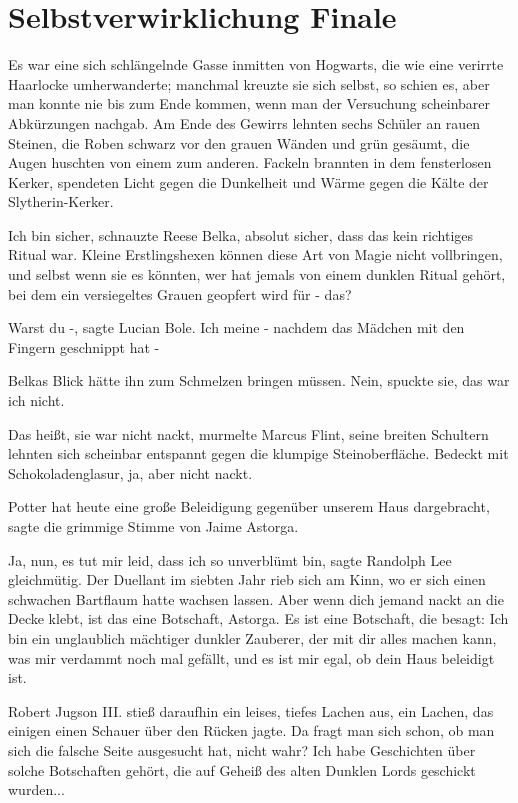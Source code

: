 \chapter{Selbstverwirklichung Finale}

Es war eine sich schlängelnde Gasse inmitten von Hogwarts, die wie eine verirrte
Haarlocke umherwanderte; manchmal kreuzte sie sich selbst, so schien es, aber
man konnte nie bis zum Ende kommen, wenn man der Versuchung scheinbarer
Abkürzungen nachgab. Am Ende des Gewirrs lehnten sechs Schüler an rauen Steinen,
die Roben schwarz vor den grauen Wänden und grün gesäumt, die Augen huschten von
einem zum anderen. Fackeln brannten in dem fensterlosen Kerker, spendeten Licht
gegen die Dunkelheit und Wärme gegen die Kälte der Slytherin-Kerker.

\glqq Ich bin sicher\grqq{}, schnauzte Reese Belka, \glqq absolut sicher, dass
das kein richtiges Ritual war. Kleine Erstlingshexen können diese Art von Magie
nicht vollbringen, und selbst wenn sie es könnten, wer hat jemals von einem
dunklen Ritual gehört, bei dem ein versiegeltes Grauen geopfert wird für -
das?\grqq{}

\glqq Warst du -\grqq{}, sagte Lucian Bole. \glqq Ich meine - nachdem das
Mädchen mit den Fingern geschnippt hat -\grqq{}

Belkas Blick hätte ihn zum Schmelzen bringen müssen. \glqq Nein\grqq{}, spuckte
sie, \glqq das war ich nicht.\grqq{}

\glqq Das heißt, sie war nicht nackt\grqq{}, murmelte Marcus Flint, seine
breiten Schultern lehnten sich scheinbar entspannt gegen die klumpige
Steinoberfläche. \glqq Bedeckt mit Schokoladenglasur, ja, aber nicht
nackt.\grqq{}

\glqq Potter hat heute eine große Beleidigung gegenüber unserem Haus
dargebracht\grqq{}, sagte die grimmige Stimme von Jaime Astorga.

\glqq Ja, nun, es tut mir leid, dass ich so unverblümt bin\grqq{}, sagte
Randolph Lee gleichmütig. Der Duellant im siebten Jahr rieb sich am Kinn, wo er
sich einen schwachen Bartflaum hatte wachsen lassen. \glqq Aber wenn dich jemand
nackt an die Decke klebt, ist das eine Botschaft, Astorga. Es ist eine
Botschaft, die besagt: Ich bin ein unglaublich mächtiger dunkler Zauberer, der
mit dir alles machen kann, was mir verdammt noch mal gefällt, und es ist mir
egal, ob dein Haus beleidigt ist.\grqq{}

Robert Jugson III. stieß daraufhin ein leises, tiefes Lachen aus, ein Lachen,
das einigen einen Schauer über den Rücken jagte. \glqq Da fragt man sich schon,
ob man sich die falsche Seite ausgesucht hat, nicht wahr? Ich habe Geschichten
über solche Botschaften gehört, die auf Geheiß des alten Dunklen Lords geschickt
wurden...\grqq{}

